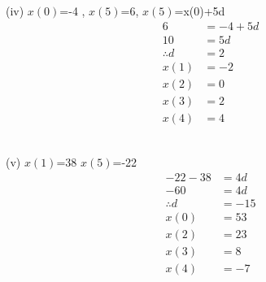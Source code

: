 \documentclass[journal,12pt,twocolumn]{IEEEtran}
\theoremstyle{remark}
\begin{document}
     (iv) $x(0)$=-4 , $x(5)$=6, $x(5)$=x(0)+5d\\
\begin{align}
     6&=-4+5d\\
     10&=5d\\
     \therefore d&=2\\
          x(1)&=-2\\
          x(2)&=0\\
          x(3)&=2\\
          x(4)&=4
\end{align}
          \\ \vspace{0.25cm} 
          
     (v)  $x(1)$=38 $x(5)$=-22 \\
     \begin{align}
         -22-38&=4d\\
          -60&=4d\\
           \therefore d&=-15\\
            x(0)&=53\\
            x(2)&=23\\
            x(3)&=8\\
            x(4)&=-7\\
     \end{align}
             
          
\end{document}
